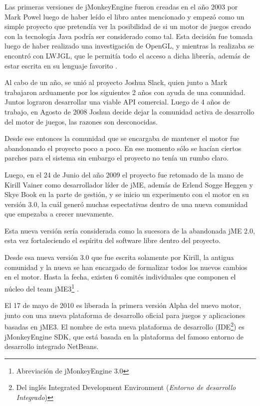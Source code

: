 \documentclass[a4paper,12pt,openany,oneside]{book}
\begin{document}
Las primeras versiones de jMonkeyEngine fueron creadas en el año 2003 por Mark Powel luego de haber leído el libro antes mencionado y empezó como un simple proyecto que pretendía ver la posibilidad de si un motor de juegos creado con la tecnología Java podría ser considerado como tal. Esta decisión fue tomada luego de haber realizado una investigación de OpenGL, y mientras la realizaba se encontró con LWJGL, que le permitía todo el acceso a dicha librería, además de estar escrita en su lenguaje favorito \cite{WIKIJME}. 

Al cabo de un año, se unió al proyecto Joshua Slack, quien junto a Mark trabajaron arduamente por los siguientes 2 años con ayuda de una comunidad. Juntos lograron desarrollar una viable API comercial. Luego de 4 años de trabajo, en Agosto de 2008 Joshua decide dejar la comunidad  activa de desarrollo del motor de juegos, las razones son desconocidas. 

Desde ese entonces la comunidad que se encargaba de mantener el motor fue abandonando el proyecto poco a poco. En ese momento sólo se hacían ciertos parches para el sistema sin embargo el proyecto no tenía un rumbo claro.

Luego, en el 24 de Junio del año 2009 el proyecto fue retomado de la mano de Kirill Vainer como desarrollador líder de jME, además de Erlend Sogge Heggen y Skye Book en la parte de gestión, y se inicio un experimento con el motor en su versión 3.0, la cuál generó muchas espectativas dentro de una nueva comunidad que empezaba a crecer nuevamente. 

Esta nueva versión sería considerada como la sucesora de la abandonada jME 2.0, esta vez fortaleciendo el espíritu del software libre dentro del proyecto.

Desde esa nueva versión 3.0 que fue escrita solamente por Kirill, la antigua comunidad y la nueva se han encargado de formalizar todos los nuevos cambios en el motor. Hasta la fecha, existen 6 comités individuales que componen el núcleo del team jME3\footnote{Abreviación de jMonkeyEngine 3.0} \cite{BOOK}.

El 17 de mayo de 2010 es liberada la primera versión Alpha del nuevo motor, junto con una nueva plataforma de desarrollo oficial para juegos y aplicaciones basadas en jME3. El nombre de esta nueva plataforma de desarrollo (IDE\footnote{Del inglés Integrated Development Environment (\textit{Entorno de desarrollo Integrado})}) es jMonkeyEngine SDK, que está basada en la plataforma del famoso entorno de desarrollo integrado NetBeans.
\end{document}
